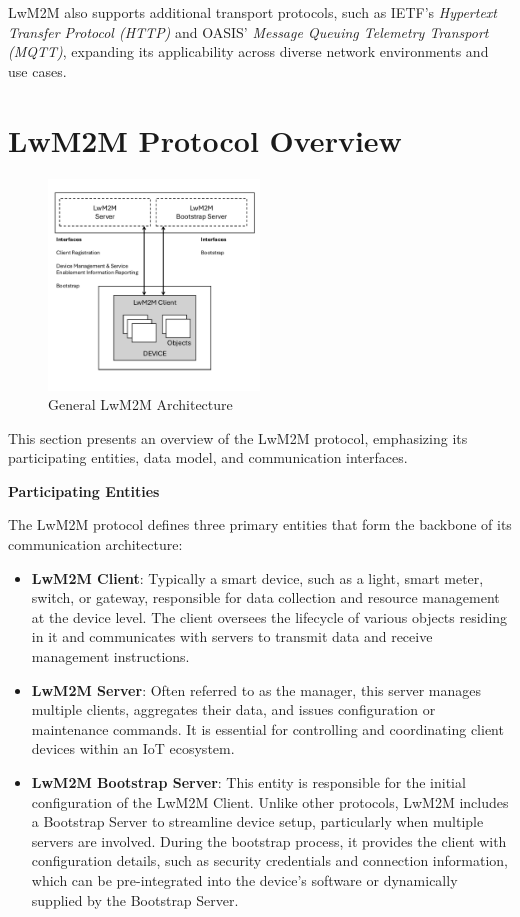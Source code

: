 \documentclass[11pt,sigconf]{iabart}
\begin{document}
LwM2M also supports additional transport protocols, such as IETF's \textit{Hypertext Transfer Protocol (HTTP)}\cite{http-spec} and OASIS' \textit{Message Queuing Telemetry Transport (MQTT)}\cite{mqtt-spec}, expanding its applicability across diverse network environments and use cases.

\section{LwM2M Protocol Overview} \label{overview}

\begin{figure}[h]
  \centering
  \includegraphics[width=0.5\textwidth]{figs/arch.pdf}
  \caption{General LwM2M Architecture}
  \label{fig:overall_architecture}
\end{figure}

This section presents an overview of the LwM2M protocol, emphasizing its participating entities, data model, and communication interfaces.

\textbf{Participating Entities}

The LwM2M protocol defines three primary entities that form the backbone of its communication architecture:

\begin{itemize}
  \item \textbf{LwM2M Client}: Typically a smart device, such as a light, smart meter, switch, or gateway, responsible for data collection and resource management at the device level. The client oversees the lifecycle of various objects residing in it and communicates with servers to transmit data and receive management instructions.
  \item \textbf{LwM2M Server}: Often referred to as the manager, this server manages multiple clients, aggregates their data, and issues configuration or maintenance commands. It is essential for controlling and coordinating client devices within an IoT ecosystem.
  \item \textbf{LwM2M Bootstrap Server}: This entity is responsible for the initial configuration of the LwM2M Client. Unlike other protocols, LwM2M includes a Bootstrap Server to streamline device setup, particularly when multiple servers are involved. During the bootstrap process, it provides the client with configuration details, such as security credentials and connection information, which can be pre-integrated into the device's software or dynamically supplied by the Bootstrap Server.
\end{itemize}
\end{document}
